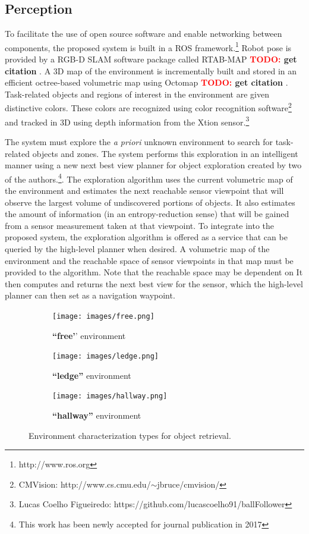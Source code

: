 \documentclass[conference]{IEEEtran}
\newcommand{\TODO}[1]{ {\bf \textcolor{red}{TODO:} #1 }}
\begin{document}
\subsection{Perception}
\label{sec:perception}
%
To facilitate the use of open source software and enable networking between components, the proposed system is built in a ROS framework.\footnote{http://www.ros.org} Robot pose is provided by a RGB-D SLAM software package called RTAB-MAP\cite{rtabmap} \TODO{get citation}. A 3D map of the environment is incrementally built and stored in an efficient octree-based volumetric map using Octomap\cite{octomap}\TODO{get citation}.  Task-related objects and regions of interest in the environment are given distinctive colors. These colors are recognized using color recognition software\footnote{CMVision: http://www.cs.cmu.edu/$\sim$jbruce/cmvision/} and tracked in 3D using depth information from the Xtion sensor.\footnote{Lucas Coelho Figueiredo: https://github.com/lucascoelho91/ballFollower}

The system must explore the \textit{a priori} unknown environment to search for task-related objects and zones. The system performs this exploration in an intelligent manner using a new next best view planner for object exploration created by two of the authors.\footnote{This work has been newly accepted for journal publication in 2017}. The exploration algorithm uses the current volumetric map of the environment and estimates the next reachable sensor viewpoint that will observe the largest volume of undiscovered portions of objects. It also estimates the amount of information (in an entropy-reduction sense) that will be gained from a sensor measurement taken at that viewpoint. To integrate into the proposed system, the exploration algorithm is offered as a service that can be queried by the high-level planner when desired. A volumetric map of the environment and the reachable space of sensor viewpoints in that map must be provided to the algorithm. Note that the reachable space may be dependent on It then computes and returns the next best view for the sensor, which the high-level planner can then set as a navigation waypoint.

\begin{figure}[t]
      \centering
      \begin{subfigure}[t]{0.15\textwidth}
        \texttt{[image: images/free.png]}
        \caption{\textbf{``free'}' environment}
    \end{subfigure}
    \begin{subfigure}[t]{0.15\textwidth}
        \texttt{[image: images/ledge.png]}
        \caption{\textbf{``ledge''} environment}
    \end{subfigure}
        \begin{subfigure}[t]{0.15\textwidth}
        \texttt{[image: images/hallway.png]}
        \caption{\textbf{``hallway''} environment}
    \end{subfigure}
      \caption{Environment characterization types for object retrieval.}
      \label{fig:characters}
   \end{figure}
\end{document}
